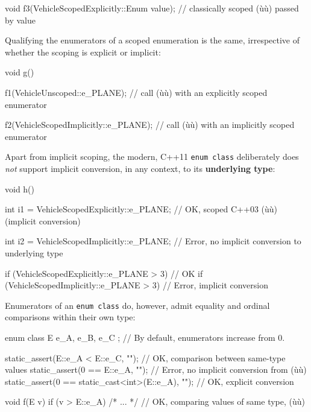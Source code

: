 \begin{emcppslisting}[emcppsbatch=e3,basicstyle={\ttfamily\footnotesize}]
void f3(VehicleScopedExplicitly::Enum value);
    // classically scoped (ù{}ù) passed by value
\end{emcppslisting}

\noindent Qualifying the enumerators of a scoped enumeration is the same,
irrespective of whether the scoping is explicit or implicit:

\begin{emcppslisting}[emcppsbatch=e3]
void g()
{
    f1(VehicleUnscoped::e_PLANE);
        // call (ù{}ù) with an explicitly scoped enumerator

    f2(VehicleScopedImplicitly::e_PLANE);
        // call (ù{}ù) with an implicitly scoped enumerator
}
\end{emcppslisting}

\noindent Apart from implicit scoping, the modern, C++11
\texttt{enum}~\texttt{class} deliberately does \emph{not} support
implicit conversion, in any context, to its \textbf{underlying type}:

\begin{emcppslisting}[emcppsbatch=e3]
void h()
{
    int i1 = VehicleScopedExplicitly::e_PLANE;
       // OK, scoped C++03 (ù{}ù) (implicit conversion)

    int i2 = VehicleScopedImplicitly::e_PLANE;
        // Error, no implicit conversion to underlying type

    if (VehicleScopedExplicitly::e_PLANE > 3) {} // OK
    if (VehicleScopedImplicitly::e_PLANE > 3) {} // Error, implicit conversion
}
\end{emcppslisting}

\noindent Enumerators of an \texttt{enum}~\texttt{class} do, however, admit
equality and ordinal comparisons within their own type:

\begin{emcppslisting}[emcppsbatch=e4]
enum class E { e_A, e_B, e_C };  // By default, enumerators increase from 0.

static_assert(E::e_A < E::e_C, "");  // OK, comparison between same-type values
static_assert(0 == E::e_A, "");      // Error, no implicit conversion from (ù{}ù)
static_assert(0 == static_cast<int>(E::e_A), "");  // OK, explicit conversion

void f(E v)
{
    if (v > E::e_A) { /* ... */ }  // OK, comparing values of same type, (ù{}ù)
}
\end{emcppslisting}

